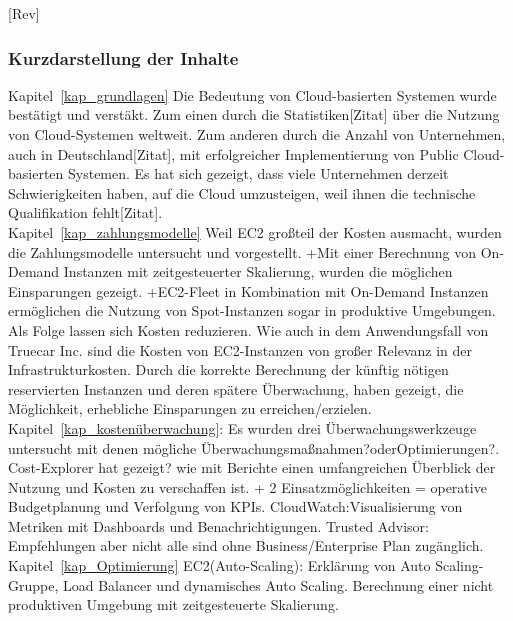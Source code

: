 [Rev]
\subsubsection*{Kurzdarstellung der Inhalte}
Kapitel~\ref{kap_grundlagen} %
Die Bedeutung von Cloud-basierten Systemen wurde bestätigt und verstäkt. Zum einen durch die Statistiken[Zitat] über die Nutzung von Cloud-Systemen weltweit. Zum anderen durch die Anzahl von Unternehmen, auch in Deutschland[Zitat], mit erfolgreicher Implementierung von Public Cloud-basierten Systemen. Es hat sich gezeigt, dass viele Unternehmen derzeit Schwierigkeiten haben, auf die Cloud umzusteigen, weil ihnen die technische Qualifikation fehlt[Zitat].
\\
Kapitel~\ref{kap_zahlungsmodelle} Weil EC2 großteil der Kosten ausmacht, wurden die Zahlungsmodelle untersucht und vorgestellt. 
+Mit einer Berechnung von On-Demand Instanzen mit zeitgesteuerter Skalierung, wurden die möglichen Einsparungen gezeigt.
+EC2-Fleet in Kombination mit On-Demand Instanzen ermöglichen die Nutzung von Spot-Instanzen sogar in produktive Umgebungen. Als Folge lassen sich Kosten reduzieren.
%
Wie auch in dem Anwendungsfall von Truecar Inc. sind die Kosten von EC2-Instanzen von großer Relevanz in der Infrastrukturkosten. Durch die korrekte Berechnung der künftig nötigen reservierten Instanzen und deren spätere Überwachung, haben gezeigt, die Möglichkeit, erhebliche Einsparungen zu erreichen/erzielen.
\\
Kapitel~\ref{kap_kostenüberwachung}: Es wurden drei Überwachungswerkzeuge untersucht mit denen mögliche Überwachungsmaßnahmen?oderOptimierungen?.
%
Cost-Explorer hat gezeigt? wie mit Berichte einen umfangreichen Überblick der Nutzung und Kosten zu verschaffen ist. 
+ 2 Einsatzmöglichkeiten = operative Budgetplanung und Verfolgung von KPIs.
%
CloudWatch:Visualisierung von Metriken mit Dashboards und Benachrichtigungen.
%
Trusted Advisor: Empfehlungen aber nicht alle sind ohne Business/Enterprise Plan zugänglich.
\\
Kapitel~\ref{kap_Optimierung} EC2(Auto-Scaling): 
Erklärung von Auto Scaling-Gruppe, Load Balancer und dynamisches Auto Scaling.
Berechnung einer nicht produktiven Umgebung mit zeitgesteuerte Skalierung.

